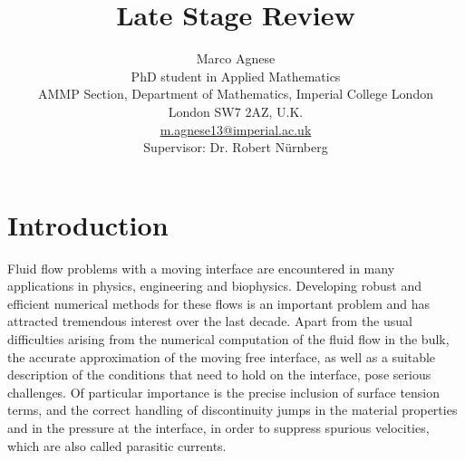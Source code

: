 \documentclass[a4paper,11pt,onecolumn]{article}
\begin{document}
\title{Late Stage Review}
\author{Marco Agnese \\
PhD student in Applied Mathematics \\
AMMP Section, Department of Mathematics, Imperial College London \\
London SW7 2AZ, U.K. \\
\url{m.agnese13@imperial.ac.uk}\\
Supervisor: Dr. Robert N\"urnberg}

\maketitle

\captionsetup[subfigure]{labelformat=empty} %

\section{Introduction}\label{sec:introduction}
Fluid flow problems with a moving interface are encountered in many
applications in physics, engineering and biophysics. Developing robust and
efficient numerical methods for these flows is an important problem and
has attracted tremendous interest over the last decade. Apart from the usual
difficulties arising from the numerical computation of the fluid flow in the
bulk, the accurate approximation of the moving free interface, as well as a
suitable description of the conditions that need to hold on the interface,
pose serious challenges. Of particular importance is the precise inclusion of
surface tension terms, and the correct handling of discontinuity jumps in the
material properties and in the pressure at the interface, in order to suppress
spurious velocities, which are also called parasitic currents.
\end{document}
